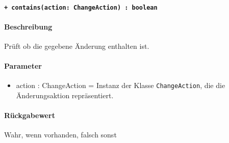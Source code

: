 \paragraph{\texttt{+ contains(action: ChangeAction) : boolean}}\label{AP_Changes_contains}%
\paragraph*{Beschreibung}
Prüft ob die gegebene Änderung enthalten ist.
\paragraph*{Parameter}
\begin{itemize}
    \item action : ChangeAction = Instanz der Klasse \verb#ChangeAction#, die die Änderungsaktion repräsentiert.
\end{itemize}
\paragraph*{Rückgabewert}
Wahr, wenn vorhanden, falsch sonst